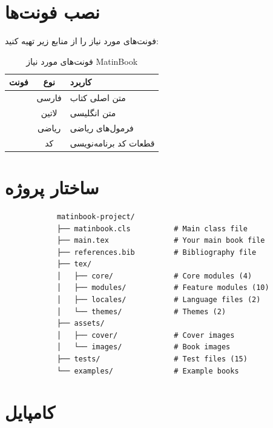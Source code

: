 \documentclass{matinbook}
\begin{document}
    \section{نصب فونت‌ها}
    
    فونت‌های مورد نیاز را از منابع زیر تهیه کنید:
    
    \begin{table}[h]
        \centering
        \caption{فونت‌های مورد نیاز MatinBook}
        \label{tab:fonts}
        \begin{tabular}{|c|c|C{5cm}|}
            \hline
            \textbf{فونت} & \textbf{نوع} & \textbf{کاربرد} \\
            \hline
             & فارسی & متن اصلی کتاب \\
             & لاتین & متن انگلیسی \\
             & ریاضی & فرمول‌های ریاضی \\
             & کد & قطعات کد برنامه‌نویسی \\
            \hline
        \end{tabular}
    \end{table}
    
    \section{ساختار پروژه}
    
    \begin{latin}
        \begin{verbatim}
            matinbook-project/
            ├── matinbook.cls          # Main class file
            ├── main.tex               # Your main book file
            ├── references.bib         # Bibliography file
            ├── tex/
            │   ├── core/              # Core modules (4)
            │   ├── modules/           # Feature modules (10)
            │   ├── locales/           # Language files (2)
            │   └── themes/            # Themes (2)
            ├── assets/
            │   ├── cover/             # Cover images
            │   └── images/            # Book images
            ├── tests/                 # Test files (15)
            └── examples/              # Example books
        \end{verbatim}
    \end{latin}
    \label{code:structure}
    
    \section{کامپایل}
    
\end{document}
